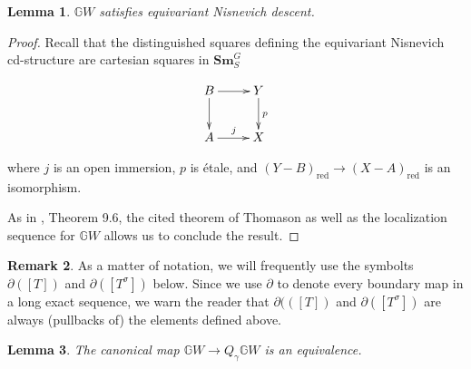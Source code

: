 \documentclass[draftthesis,tocnosub,noragright,centerchapter,10pt]{uiucthesis2009}
\newcommand{\mbb}{\mathbb}
\newcommand{\Sm}[1]{\mathbf{Sm}_{#1}}
\theoremstyle{plain}
\newtheorem{lemma}{Lemma}
\theoremstyle{definition}
\newtheorem{remark}[lemma]{Remark}
\begin{document}
\begin{lemma}
$\mbb GW$ satisfies equivariant Nisnevich descent. 
\end{lemma}

\begin{proof}
Recall that the distinguished squares defining the equivariant
Nisnevich cd-structure are cartesian squares in $\Sm{S}^G$ 

\[
\xymatrix{B \ar[r]\ar[d] & Y \ar[d]^p \\ A \ar[r]^j & X}
\]

where $j$ is an open immersion, $p$ is \'etale, and
$(Y-B)_{\mathrm{red}} \rightarrow (X-A)_{\mathrm{red}}$ is an
isomorphism. 

As in \cite{Schder}, Theorem 9.6, the cited theorem of Thomason as well as the
localization sequence for $\mbb GW$ allows us to conclude the result. 
\end{proof}

\begin{remark}
As a matter of notation, we will frequently use the symbolts
$\partial([T])$ and $\partial([T^\sigma])$ below. Since we use
$\partial$ to denote every boundary map in a long exact sequence, we
warn the reader that $\partial(([T])$ and $\partial([T^\sigma])$ are
always (pullbacks of) the elements defined above. 
\end{remark}

\begin{lemma}\label{lem:GWb_eq}
The canonical map $\mbb GW \rightarrow Q_\gamma \mbb GW$ is an
equivalence. 
\end{lemma}
\end{document}
